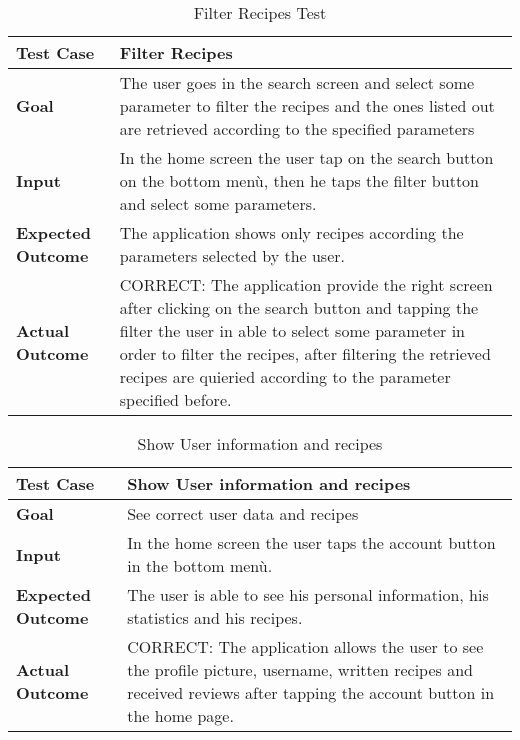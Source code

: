 \begin{table}[H]
	\centering
	\begin{tabular}{ll}
	\hline
	\textbf{Test Case}& Filter Recipes\\
	\hline
	\textbf{Goal}& The user goes in the search screen and select some parameter to filter the recipes and the ones listed out are retrieved according to the specified parameters\\
	\hline
	\textbf{Input}& In the home screen the user tap on the search button on the bottom menù, then he taps the filter button and select some parameters.\\
	\hline
	\textbf{Expected Outcome}& The application shows only recipes according the parameters selected by the user.\\
	\hline
	\textbf{Actual Outcome}& CORRECT: The application provide the right screen after clicking on the search button and tapping the filter the user in able to select some parameter in order to filter the recipes, after filtering the retrieved recipes are quieried according to the parameter specified before.\\
	\hline	
	\end{tabular}
	\caption{Filter Recipes Test}
\end{table}

\begin{table}[H]
	\centering
	\begin{tabular}{ll}
	\hline
	\textbf{Test Case}& Show User information and recipes\\
	\hline
	\textbf{Goal}& See correct user data and recipes\\
	\hline
	\textbf{Input}& In the home screen the user taps the account button in the bottom menù.\\
	\hline
	\textbf{Expected Outcome}& The user is able to see his personal information, his statistics and his recipes.\\
	\hline
	\textbf{Actual Outcome}& CORRECT: The application allows the user to see the profile picture, username, written recipes and received reviews after tapping the account button in the home page.\\
	\hline	
	\end{tabular}
	\caption{Show User information and recipes}
\end{table}

